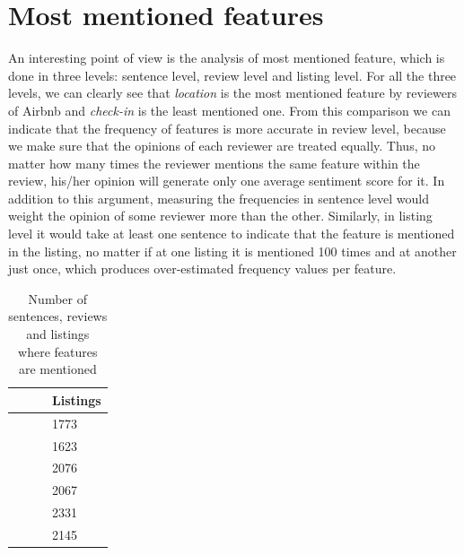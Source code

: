 \section{Most mentioned features}
An interesting point of view is the analysis of most mentioned feature, which is done in three levels: sentence level, review level and listing level. For all the three levels, we can clearly see that \textit{location} is the most mentioned feature by reviewers of Airbnb and \textit{check-in} is the least mentioned one. From this comparison we can indicate that the frequency of features is more accurate in review level, because we make sure that the opinions of each reviewer are treated equally. Thus, no matter how many times the reviewer mentions the same feature within the review, his/her opinion will generate only one average sentiment score for it. In addition to this argument, measuring the frequencies in sentence level would weight the opinion of some reviewer more than the other. Similarly, in listing level it would take at least one sentence to indicate that the feature is mentioned in the listing, no matter if at one listing it is mentioned 100 times and at another just once, which produces over-estimated frequency values per feature.
\begin{table}[h!]
\footnotesize 
\centering
\begin{tabular}{|m{1.7cm}|m{2.4cm}|m{2.6cm}|m{1.15cm}|}

\hline
\centering {\textbf{}}  & \centering {\textbf{Sentences}} & \centering {\textbf{Reviews}} & {\textbf{Listings}} \\

\hline
\centering {Accuracy}  & \centering {8364} & \centering {7915} &  {1773} \\ \hline

 \centering {Check-in} & \centering {5818} & \centering  {5454} & {1623}\\ \hline
 
 \centering {Cleanliness} & \centering {18440} & \centering {17757} & {2076}\\ \hline
 
\centering  {Communication} & \centering {16894} & \centering {14610} & {2067} \\ \hline

\centering {Location} & \centering {69616} & \centering {44539} & {2331}\\ \hline

\centering {Value} & \centering {19862} & \centering {18811} & {2145}\\ \hline
\end{tabular}
\caption{Number of sentences, reviews and listings where features are mentioned}
\label{res1}
\end{table}

